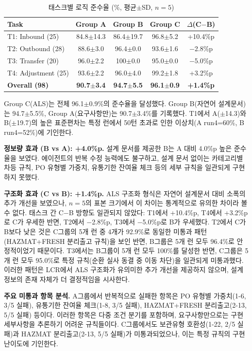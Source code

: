 \documentclass[conference]{IEEEtran}
\begin{document}
\begin{table}[htbp]
\caption{태스크별 로직 준수율 (\%, 평균$\pm$SD, $n=5$)}
\label{tab:lcr-l2}
\centering
\small
\begin{tabular}{@{}lcccc@{}}
\toprule
Task & Group A & Group B & Group C & $\Delta$(C$-$B) \\
\midrule
T1: Inbound (25) & 84.8$\pm$14.3 & 86.4$\pm$19.7 & 96.8$\pm$5.2 & +10.4\%p \\
T2: Outbound (28) & 88.6$\pm$3.0 & 96.4$\pm$0.0 & 93.6$\pm$1.6 & $-$2.8\%p \\
T3: Transfer (20) & 96.0$\pm$2.2 & 100$\pm$0.0 & 95.0$\pm$0.0 & $-$5.0\%p \\
T4: Adjustment (25) & 93.6$\pm$2.2 & 96.0$\pm$4.0 & 99.2$\pm$1.8 & +3.2\%p \\
\midrule
\textbf{Overall (98)} & \textbf{90.7$\pm$3.4} & \textbf{94.7$\pm$5.5} & \textbf{96.1$\pm$0.9} & \textbf{+1.4\%p} \\
\bottomrule
\end{tabular}
\end{table}

Group C(ALS)는 전체 96.1$\pm$0.9\%의 준수율을 달성했다. Group B(자연어 설계문서)는 94.7$\pm$5.5\%, Group A(요구사항만)는 90.7$\pm$3.4\%를 기록했다. T1에서 A($\pm$14.3)와 B($\pm$19.7)의 높은 표준편차는 특정 런에서 50턴 초과로 인한 이상치(A run4=60\%, B run4=52\%)에 기인한다.

\textbf{정보량 효과 (B vs A): +4.0\%p.} 설계 문서를 제공한 B는 A 대비 4.0\%p 높은 준수율을 보였다. 에이전트의 반복 수정 능력에도 불구하고, 설계 문서 없이는 카테고리별 차등 규칙, PO 유형별 가중치, 유통기한 잔여율 체크 등의 세부 규칙을 일관되게 구현하지 못했다.

\textbf{구조화 효과 (C vs B): +1.4\%p.} ALS 구조화 형식은 자연어 설계문서 대비 소폭의 추가 개선을 보였으나, $n=5$의 표본 크기에서 이 차이는 통계적으로 유의한 차이라 볼 수 없다. 태스크 간 C$-$B 방향도 일관되지 않았다: T1에서 +10.4\%p, T4에서 +3.2\%p로 C가 우세한 반면, T2에서 $-$2.8\%p, T3에서 $-$5.0\%p로 B가 우세했다. T2에서 C가 B보다 낮은 것은 C그룹의 5개 런 중 4개가 92.9\%로 동일한 미통과 패턴(HAZMAT+FRESH 분리출고 규칙)을 보인 반면, B그룹은 5개 런 모두 96.4\%로 안정적이었기 때문이다. T3에서는 B그룹이 5개 런 모두 100\%를 달성한 반면, C그룹은 5개 런 모두 95.0\%로 특정 규칙(순환 실사 동결 중 이동 차단)을 일관되게 미통과했다. 이러한 패턴은 LCR에서 ALS 구조화가 유의미한 추가 개선을 제공하지 않으며, 설계 정보의 존재 자체가 더 결정적임을 시사한다.

\textbf{주요 미통과 항목 분석.} A그룹에서 반복적으로 실패한 항목은 PO 유형별 가중치(1-6, 3/5 실패), 유통기한 잔여율 체크(1-8, 3/5 실패), HAZMAT+FRESH 분리출고(2-13, 5/5 실패) 등이다. 이러한 항목은 다중 조건 분기를 포함하며, 요구사항만으로는 구현 세부사항을 추론하기 어려운 규칙들이다. C그룹에서도 보관유형 호환성(1-22, 2/5 실패)과 HAZMAT 분리출고(2-13, 5/5 실패)가 미통과되었으나, 이는 특정 규칙의 구현 난이도에 기인한다.
\end{document}
